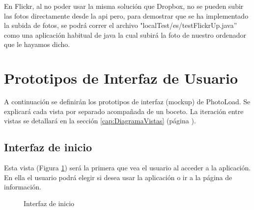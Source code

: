 \documentclass{scrartcl}
\begin{document}
En Flickr, al no poder usar la misma solución que Dropbox, no se pueden subir las fotos directamente desde la api pero, para demostrar que se ha implementado la subida de fotos, se podrá correr el archivo "localTest/es/testFlickrUp.java”  como una aplicación habitual de java la cual subirá la foto de nuestro ordenador que le hayamos dicho.

\section{Prototipos de Interfaz de Usuario}\label{cap:prototipos interfaz}
A continuación se definirán los prototipos de interfaz (mockup) de PhotoLoad. Se explicará cada vista por separado acompañada de un boceto. La iteración entre vistas se detallará en la sección \ref{cap:DiagramaVistas} (página \pageref{cap:DiagramaVistas}).
\subsection{Interfaz de inicio}\label{cap:InterfazInicio}
Esta vista (Figura \ref{fig:VistaLogin}) será la primera que vea el usuario al acceder a la aplicación. En ella el usuario podrá elegir si desea usar la aplicación o ir a la página de información.

\begin{figure}[H]
	
	\centering
	\caption{Interfaz de inicio}
	\label{fig:VistaLogin}
	
\end{figure}

\end{document}
